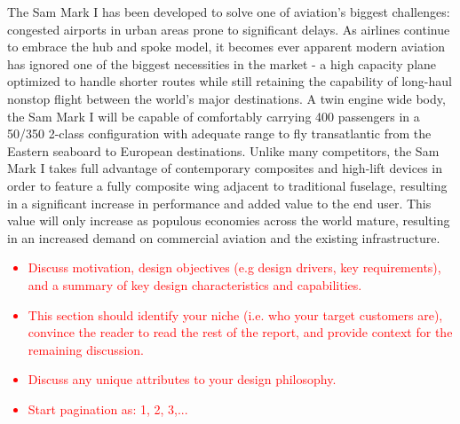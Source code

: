 The Sam Mark I has been developed to solve one of aviation's biggest challenges: congested airports in urban areas prone to significant delays.  As airlines continue to embrace the hub and spoke model, it becomes ever apparent modern aviation has ignored one of the biggest necessities in the market - a high capacity plane optimized to handle shorter routes while still retaining the capability of long-haul nonstop flight between the world's major destinations. A twin engine wide body, the Sam Mark I will be capable of comfortably carrying 400 passengers in a 50/350 2-class configuration with adequate range to fly transatlantic from the Eastern seaboard to European destinations.  Unlike many competitors, the Sam Mark I takes full advantage of contemporary composites and high-lift devices in order to feature a fully composite wing adjacent to traditional fuselage, resulting in a significant increase in performance and added value to the end user.  This value will only increase as populous economies across the world mature, resulting in an increased demand on commercial aviation and the existing infrastructure. %
\textcolor{red}{
\begin{itemize}
    \item Discuss motivation, design objectives (e.g design drivers, key requirements), and a summary of key design characteristics and capabilities. 
    \item This section should identify your niche (i.e. who your target customers are), convince the reader to read the rest of the report, and provide context for the remaining discussion. 
    \item Discuss any unique attributes to your design philosophy. 
    \item Start pagination as: 1, 2, 3,... \checkmark
\end{itemize}}